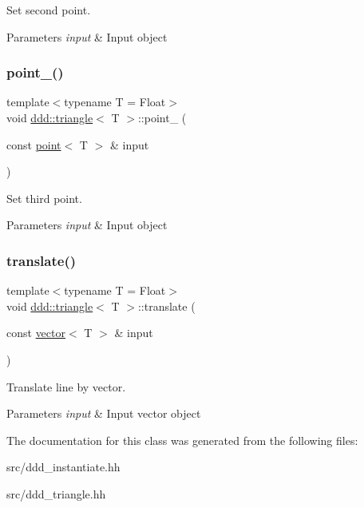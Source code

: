 Set second point. 


\begin{DoxyParams}{Parameters}
{\em input} & Input object \\
\hline
\end{DoxyParams}
\mbox{\label{classddd_1_1triangle_a3256c2d4f7c6bcc571de9743b4e536e7}} 
\subsubsection{\texorpdfstring{point\+\_()}{point\_3()}}
{\footnotesize\ttfamily template$<$typename T = Float$>$ \\
void \hyperlink{classddd_1_1triangle}{ddd\+::triangle}$<$ T $>$\+::point\+\_ (\begin{DoxyParamCaption}\item[{const \hyperlink{classddd_1_1point}{point}$<$ T $>$ \&}]{input }\end{DoxyParamCaption})\hspace{0.3cm}{\ttfamily [inline]}}



Set third point. 


\begin{DoxyParams}{Parameters}
{\em input} & Input object \\
\hline
\end{DoxyParams}
\mbox{\label{classddd_1_1triangle_a8f763fc90af4be50a284ad99020bb746}} 
\subsubsection{\texorpdfstring{translate()}{translate()}}
{\footnotesize\ttfamily template$<$typename T = Float$>$ \\
void \hyperlink{classddd_1_1triangle}{ddd\+::triangle}$<$ T $>$\+::translate (\begin{DoxyParamCaption}\item[{const \hyperlink{classddd_1_1vector}{vector}$<$ T $>$ \&}]{input }\end{DoxyParamCaption})\hspace{0.3cm}{\ttfamily [inline]}}



Translate line by vector. 


\begin{DoxyParams}{Parameters}
{\em input} & Input vector object \\
\hline
\end{DoxyParams}


The documentation for this class was generated from the following files\+:\begin{DoxyCompactItemize}
\item 
src/ddd\+\_\+instantiate.\+hh\item 
src/ddd\+\_\+triangle.\+hh\end{DoxyCompactItemize}

